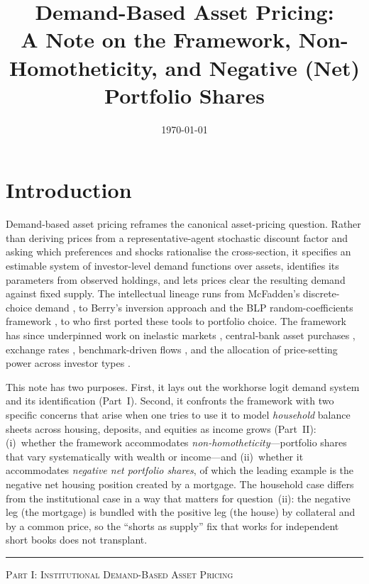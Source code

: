 \documentclass[11pt,a4paper]{article}
\title{Demand-Based Asset Pricing:\\
\large A Note on the Framework, Non-Homotheticity, and Negative (Net) Portfolio Shares}
\author{}
\date{\today}
\begin{document}
\maketitle

\section{Introduction}

Demand-based asset pricing reframes the canonical asset-pricing question.
Rather than deriving prices from a representative-agent stochastic
discount factor and asking which preferences and shocks rationalise the
cross-section, it specifies an estimable system of investor-level demand
functions over assets, identifies its parameters from observed
holdings, and lets prices clear the resulting demand against fixed
supply. The intellectual lineage runs from McFadden's discrete-choice
demand \citep{mcfadden1974conditional}, to Berry's inversion approach
\citep{berry1994estimating} and the BLP random-coefficients framework
\citep{blp1995,nevo2001measuring}, to \citet{koijen2019demand} who first
ported these tools to portfolio choice. The framework has since
underpinned work on inelastic markets
\citep{gabaix2021inelastic}, central-bank asset purchases
\citep{koijen2021qe}, exchange rates \citep{koijen2020global},
benchmark-driven flows \citep{pavlova2023benchmarking}, and the
allocation of price-setting power across investor types
\citep{koijen2024which,haddad2025competitive}.

This note has two purposes. First, it lays out the workhorse logit
demand system and its identification (Part~I). Second, it confronts the
framework with two specific concerns that arise when one tries to use it
to model \emph{household} balance sheets across housing, deposits, and
equities as income grows (Part~II): (i)~whether the framework
accommodates \emph{non-homotheticity}---portfolio shares that vary
systematically with wealth or income---and (ii)~whether it accommodates
\emph{negative net portfolio shares}, of which the leading example is
the negative net housing position created by a mortgage. The household
case differs from the institutional case in a way that matters for
question~(ii): the negative leg (the mortgage) is bundled with the
positive leg (the house) by collateral and by a common price, so the
``shorts as supply'' fix that works for independent short books does
not transplant.

\bigskip
\hrule
\bigskip

\begin{center}\large\textsc{Part I: Institutional Demand-Based Asset Pricing}\end{center}
\end{document}
